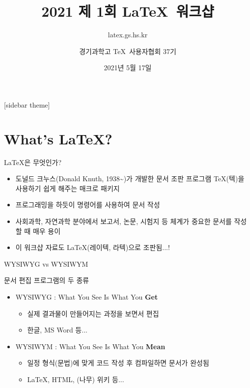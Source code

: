 \documentclass[12pt]{gshs_beamer_class}
\title[]{2021 제 1회 \LaTeX\ 워크샵}
\subtitle[]{latex.gs.hs.kr}
\author[]{경기과학고 \TeX\ 사용자협회 37기}
\institute[]{경기과학고등학교}
\date[]{2021년 5월 17일}
\begin{document}
 \small

\begin{frame}[plain] %
	\titlepage
\end{frame}

[sidebar theme] %


\section{What's \LaTeX{}?}

\begin{frame}[t]{\LaTeX{}은 무엇인가?}
	\begin{itemize}
		\item 도널드 크누스(Donald Knuth, 1938\textasciitilde )가 개발한 문서 조판 프로그램 \TeX{}(텍)을 사용하기 쉽게 해주는 매크로 패키지
		\item 프로그래밍을 하듯이 명령어를 사용하여 문서 작성
		\item 사회과학, 자연과학 분야에서 보고서, 논문, 시험지 등 체계가 중요한 문서를 작성할 때 매우 용이
		\item 이 워크샵 자료도 \LaTeX (레이텍, 라텍)으로 조판됨...!
	\end{itemize}
\end{frame}


\begin{frame}[t]{WYSIWYG vs WYSIWYM}
	
	문서 편집 프로그램의 두 종류
	\vspace{10pt}
	
	\begin{itemize}
		\item WYSIWYG : What You See Is What You \textbf{Get}
		\begin{itemize} 
			\item 실제 결과물이 만들어지는 과정을 보면서 편집
			\item 한글, MS Word 등...
		\end{itemize}
		\vskip 1pc
		\item WYSIWYM : What You See Is What You \textbf{Mean}
		\begin{itemize}
			\item 일정 형식(문법)에 맞게 코드 작성 후 컴파일하면 문서가 완성됨
			\item LaTeX, HTML, (나무) 위키 등...
		\end{itemize}
	\end{itemize}
\end{frame}
\end{document}
